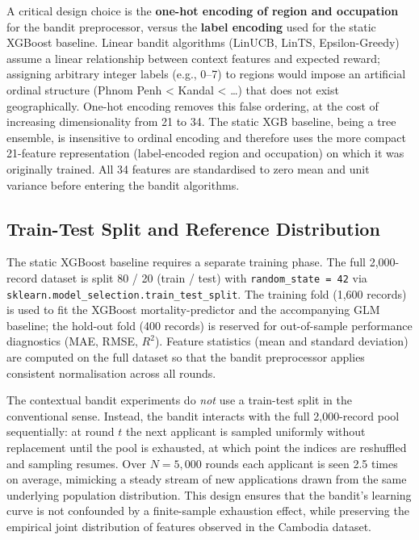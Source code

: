 A critical design choice is the \textbf{one-hot encoding of region and occupation} for the bandit preprocessor, versus the \textbf{label encoding} used for the static XGBoost baseline. Linear bandit algorithms (LinUCB, LinTS, Epsilon-Greedy) assume a linear relationship between context features and expected reward; assigning arbitrary integer labels (e.g., 0--7) to regions would impose an artificial ordinal structure (Phnom Penh \textless{} Kandal \textless{} \ldots) that does not exist geographically. One-hot encoding removes this false ordering, at the cost of increasing dimensionality from 21 to 34. The static XGB baseline, being a tree ensemble, is insensitive to ordinal encoding and therefore uses the more compact 21-feature representation (label-encoded region and occupation) on which it was originally trained. All 34 features are standardised to zero mean and unit variance before entering the bandit algorithms.

\subsection{Train-Test Split and Reference Distribution}\label{train-test-split-and-reference-distribution}

The static XGBoost baseline requires a separate training phase. The full 2,000-record dataset is split 80 / 20 (train / test) with \texttt{random\_state\ =\ 42} via \texttt{sklearn.model\_selection.train\_test\_split}. The training fold (1,600 records) is used to fit the XGBoost mortality-predictor and the accompanying GLM baseline; the hold-out fold (400 records) is reserved for out-of-sample performance diagnostics (MAE, RMSE, \(R^2\)). Feature statistics (mean and standard deviation) are computed on the full dataset so that the bandit preprocessor applies consistent normalisation across all rounds.

The contextual bandit experiments do \emph{not} use a train-test split in the conventional sense. Instead, the bandit interacts with the full 2,000-record pool sequentially: at round \(t\) the next applicant is sampled uniformly without replacement until the pool is exhausted, at which point the indices are reshuffled and sampling resumes. Over \(N = 5,000\) rounds each applicant is seen 2.5 times on average, mimicking a steady stream of new applications drawn from the same underlying population distribution. This design ensures that the bandit's learning curve is not confounded by a finite-sample exhaustion effect, while preserving the empirical joint distribution of features observed in the Cambodia dataset.

